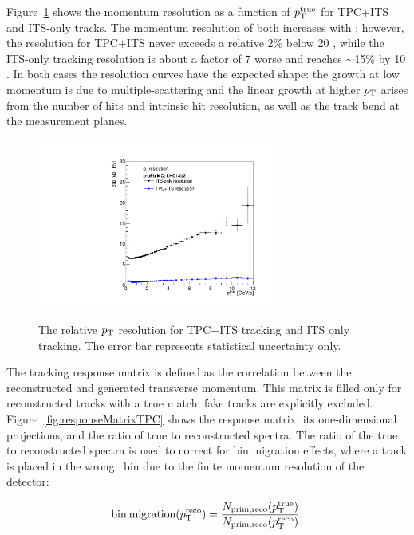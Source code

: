 Figure~\ref{fig:resolution} shows the momentum resolution as a function of $p_{\mathrm{T}}^{\mathrm{true}}$ for 
TPC+ITS and ITS-only tracks. The momentum resolution of both increases with \pt; however, the resolution for TPC+ITS never exceeds a relative 2\% below 20 \GeVc, while the ITS-only tracking resolution is about a factor of 7 worse and reaches $\sim$15\% by 10 \GeVc. In both cases the resolution curves have the expected shape: the growth at low momentum is due to multiple-scattering and the linear growth at higher $p_{\mathrm{T}}$ arises from the number of hits and intrinsic hit resolution, as well as the track bend at the measurement planes. 

\begin{figure}[hbtp]
\center
\includegraphics[width=0.7\textwidth]{Data_Analysis/Tracking/HybridAndITS_resolution_lowpt.pdf}\\
\caption{The relative $p_{\mathrm{T}}$ resolution for TPC+ITS tracking and ITS only tracking. The error bar represents statistical uncertainty only.}
\label{fig:resolution}
\end{figure}

The tracking response matrix is defined as the correlation between the reconstructed and generated transverse momentum. This matrix is filled only for reconstructed tracks with a true match; fake tracks are explicitly excluded. Figure~\ref{fig:responseMatrixTPC} shows the response matrix, its one-dimensional projections, and the ratio of true to reconstructed spectra. The ratio of the true to reconstructed spectra is used to correct for bin migration effects, where a track is placed in the wrong \pt~bin due to the finite momentum resolution of the detector:

\begin{equation}\label{eq:bin_migration}
\mathrm{bin\:migration} (p_{\mathrm{T}}^{\mathrm{reco}}) = \frac{N_{\mathrm{prim,reco}}(p_{\mathrm{T}}^{\mathrm{true}})}{N_{\mathrm{prim,reco}}(p_{\mathrm{T}}^{\mathrm{reco}})}.
\end{equation}

